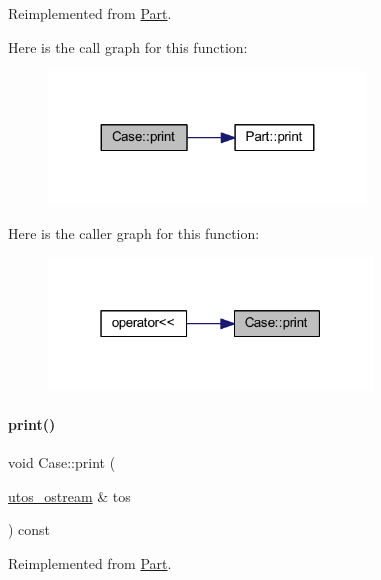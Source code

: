 Reimplemented from \mbox{\hyperlink{class_part_a4fa402b8e8fd4236ff773a7697ab2bc3}{Part}}.

Here is the call graph for this function\+:
\nopagebreak
\begin{figure}[H]
\begin{center}
\leavevmode
\includegraphics[width=239pt]{class_case_a9e54f42dcb7b62f1792a6475ce60aa79_cgraph}
\end{center}
\end{figure}
Here is the caller graph for this function\+:
\nopagebreak
\begin{figure}[H]
\begin{center}
\leavevmode
\includegraphics[width=244pt]{class_case_a9e54f42dcb7b62f1792a6475ce60aa79_icgraph}
\end{center}
\end{figure}
\mbox{\label{class_case_ae179519844b825815f4accddafae13b6}} 
\paragraph{\texorpdfstring{print()}{print()}\hspace{0.1cm}{\footnotesize\ttfamily [2/4]}}
{\footnotesize\ttfamily void Case\+::print (\begin{DoxyParamCaption}\item[{\mbox{\hyperlink{structutos__ostream}{utos\+\_\+ostream}} \&}]{tos }\end{DoxyParamCaption}) const\hspace{0.3cm}{\ttfamily [virtual]}}



Reimplemented from \mbox{\hyperlink{class_part_a9ecabe44ba3415badf82c6a23617a41e}{Part}}.

